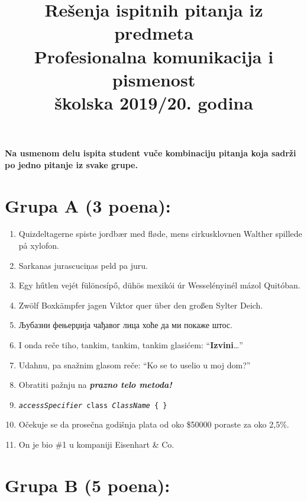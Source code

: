 \documentclass[11pt]{article}
\title{\textbf{
	Re\v senja ispitnih pitanja iz predmeta \\
	Profesionalna komunikacija i pismenost \\
	\v skolska 2019/20. godina
}}
\date{}
\begin{document}
	\maketitle

	\textbf{
		Na usmenom delu ispita student vu\v ce kombinaciju pitanja koja sadr\v zi po jedno pitanje iz svake grupe.
	}

	\section*{Grupa A (3 poena):}

	\begin{enumerate}
		\item Quizdeltagerne spiste jordb\ae r med fl\o de, mens cirkusklovnen Walther spillede p\r a xylofon.
		\item Sarkanas jurascuci\c nas peld pa juru.
		\item Egy h\H utlen vej\' et f\" ul\" oncs\' ip\H o, d\" uh\" os mexik\' oi \' ur Wessel\' enyin\' el m\' azol Quit\' oban.
		\item Zw\" olf Boxk\" ampfer jagen Viktor quer \" uber den gro\ss en Sylter Deich.
		\item Љубазни фењерџија чађавог лица хоће да ми покаже штос.
		\item I onda re\v ce tiho, {\small tankim}, {\footnotesize tankim}, {\scriptsize tankim glasi\' cem:} {\tiny ``\textbf{Izvini}\dots''}
		\item Udahnu, pa {\Large sna\v znim glasom re\v ce:} {\LARGE ``Ko  se to uselio u moj dom?''}
		\item Obratiti pa\v znju na \textbf{\emph{prazno telo metoda!}}
		\item \texttt{\textsl{accessSpecifier} class \textsl{ClassName} \{ \} }
		\item O\v cekuje se da prose\v cna godi\v snja plata od oko \$50000 poraste za oko 2,5\%.
		\item On je bio \#1 u kompaniji Eisenhart \& Co.
	\end{enumerate}

	\section*{Grupa B (5 poena):}
\end{document}
